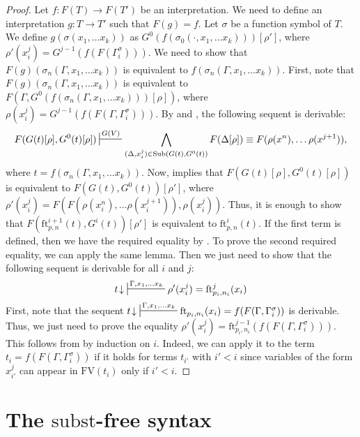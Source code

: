 \documentclass[reqno]{amsart}
\theoremstyle{definition}
\theoremstyle{remark}
\newcommand{\fs}[1]{\mathrm{#1}}
\newcommand{\FV}{\fs{FV}}
\newcommand{\subst}{\fs{subst}}
\newcommand{\ft}{\fs{ft}}
\newcommand{\sub}{\fs{Sub}}
\numberwithin{figure}{section}
\begin{document}
\begin{proof}
Let $f : F(T) \to F(T')$ be an interpretation.
We need to define an interpretation $g : T \to T'$ such that $F(g) = f$.
Let $\sigma$ be a function symbol of $T$.
We define $g(\sigma(x_1, \ldots x_k))$ as $G^0(f(\sigma_0(\cdot, x_1, \ldots x_k)))[\rho']$, where $\rho'(x_i^j) = G^{j-1}(f(F(\Gamma^\sigma_i)))$.
We need to show that $F(g)(\sigma_n(\Gamma, x_1, \ldots x_k))$ is equivalent to $f(\sigma_n(\Gamma, x_1, \ldots x_k))$.
First, note that $F(g)(\sigma_n(\Gamma, x_1, \ldots x_k))$ is equivalent to $F(\Gamma, G^0(f(\sigma_n(\Gamma, x_1, \ldots x_k)))[\rho])$, where $\rho(x_i^j) = G^{j-1}(f(F(\Gamma,\Gamma^\sigma_i)))$.
By  and , the following sequent is derivable:
\[ F(G(t)[\rho], G^0(t)[\rho]) \sststile{}{G(V)} \bigwedge_{(\Delta,x_i^j) \in \sub(G(t), G^0(t))} F(\Delta[\rho]) \equiv F(\rho(x^n), \ldots \rho(x^{j+1})), \]
where $t = f(\sigma_n(\Gamma, x_1, \ldots x_k))$.
Now,  implies that $F(G(t)[\rho], G^0(t)[\rho])$ is equivalent to $F(G(t), G^0(t))[\rho']$, where $\rho'(x_i^j) = F(F(\rho(x_i^n), \ldots \rho(x_i^{j+1})), \rho(x_i^j))$.
Thus, it is enough to show that $F(\ft^{i+1}_{p,n}(t), G^i(t))[\rho']$ is equivalent to $\ft^i_{p,n}(t)$.
If the first term is defined, then we have the required equality by .
To prove the second required equality, we can apply the same lemma.
Then we just need to show that the following sequent is derivable for all $i$ and $j$:
\[ t\!\downarrow\ \sststile{}{\Gamma, x_1, \ldots x_k} \rho'(x_i^j) = \ft^j_{p_i,n_i}(x_i) \]
First, note that the sequent $t\!\downarrow\ \sststile{}{\Gamma, x_1, \ldots x_k} \ft_{p_i,n_i}(x_i) = f(F(\Gamma, \Gamma^\sigma_i))$ is derivable.
Thus, we just need to prove the equality $\rho'(x_i^j) = \ft^{j-1}_{p_i,n_i}(f(F(\Gamma, \Gamma^\sigma_i)))$.
This follows from  by induction on $i$.
Indeed, we can apply it to the term $t_i = f(F(\Gamma, \Gamma^\sigma_i))$ if it holds for terms $t_{i'}$ with $i' < i$ since variables of the form $x_{i'}^j$ can appear in $\FV(t_i)$ only if $i' < i$.
\end{proof}

\section{The $\subst$-free syntax}
\end{document}
